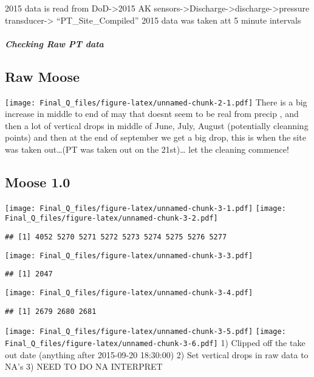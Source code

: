 \documentclass[
]{article}
\begin{document}
2015 data is read from DoD-\textgreater2015 AK
sensors-\textgreater Discharge-\textgreater discharge-\textgreater pressure
transducer-\textgreater{} ``PT\_Site\_Compiled'' 2015 data was taken att
5 minute intervals

\hypertarget{checking-raw-pt-data}{%
\subparagraph{Checking Raw PT data}\label{checking-raw-pt-data}}

\hypertarget{raw-moose}{%
\subsection{Raw Moose}\label{raw-moose}}

\texttt{[image: Final\_Q\_files/figure-latex/unnamed-chunk-2-1.pdf]} There
is a big increase in middle to end of may that doesnt seem to be real
from precip , and then a lot of vertical drops in middle of June, July,
August (potentially cleanning points) and then at the end of september
we get a big drop, this is when the site was taken out\ldots(PT was
taken out on the 21st)\ldots{} let the cleaning commence!

\hypertarget{moose-1.0}{%
\subsection{Moose 1.0}\label{moose-1.0}}

\texttt{[image: Final\_Q\_files/figure-latex/unnamed-chunk-3-1.pdf]}
\texttt{[image: Final\_Q\_files/figure-latex/unnamed-chunk-3-2.pdf]}

\begin{verbatim}
## [1] 4052 5270 5271 5272 5273 5274 5275 5276 5277
\end{verbatim}

\texttt{[image: Final\_Q\_files/figure-latex/unnamed-chunk-3-3.pdf]}

\begin{verbatim}
## [1] 2047
\end{verbatim}

\texttt{[image: Final\_Q\_files/figure-latex/unnamed-chunk-3-4.pdf]}

\begin{verbatim}
## [1] 2679 2680 2681
\end{verbatim}

\texttt{[image: Final\_Q\_files/figure-latex/unnamed-chunk-3-5.pdf]}
\texttt{[image: Final\_Q\_files/figure-latex/unnamed-chunk-3-6.pdf]} 1)
Clipped off the take out date (anything after 2015-09-20 18:30:00) 2)
Set vertical drops in raw data to NA's 3) NEED TO DO NA INTERPRET
\end{document}
